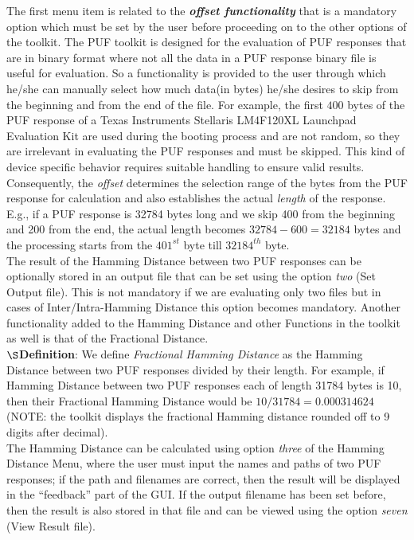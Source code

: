 The first menu item is related to the \emph{\textbf{offset functionality}} that is a mandatory option which must be set by the user before proceeding on to the other options of the toolkit. The PUF toolkit is designed for the evaluation of PUF responses that are in binary format where not all the data in a PUF response binary file is useful for evaluation. So a functionality is provided to the user through which he/she can manually select how much data(in bytes) he/she desires to skip from the beginning and from the end of the file.
For example, the first $400$ bytes of the PUF response of a Texas Instruments Stellaris LM4F120XL Launchpad Evaluation Kit are used during the booting process and are not random, so they are irrelevant in evaluating the PUF responses and must be skipped. This kind of device specific behavior requires suitable handling to ensure valid results.\\

Consequently, the \emph{offset} determines the selection range of the bytes from the PUF response for calculation and also establishes the actual \emph{length} of the response. E.g., if a PUF response is 32784 bytes long and we skip 400 from the beginning and 200 from the end, the actual length becomes $32784-600 = 32184$ bytes and the processing starts from the $401^{st}$ byte till $32184^{th}$ byte.\\

The result of the Hamming Distance between two PUF responses can be optionally stored in an output file that can be set using the option \emph{two} (Set Output file). This is not mandatory if we are evaluating only two files but in cases of Inter/Intra-Hamming Distance this option becomes mandatory. Another functionality added to the Hamming Distance and other Functions in the toolkit as well is that of the Fractional Distance.\\

\textbf{$\S$Definition}: We define \emph{Fractional Hamming Distance} as the Hamming Distance between two PUF
responses divided by their length. For example, if Hamming Distance between two PUF responses each of length 31784 bytes is 10, then their Fractional Hamming Distance would be $ 10 / 31784 = 0.000314624$ (NOTE: the toolkit displays the fractional Hamming distance rounded off to 9 digits after decimal).\\

The Hamming Distance can be calculated using option \emph{three} of the Hamming Distance Menu, where the user must input the names and paths of two PUF responses; if the path and filenames are correct, then the result will be displayed in the ``feedback'' part of the GUI. If the output filename has been set before, then the result is also stored in that file and can be viewed using the option \emph{seven} (View Result file).\\

